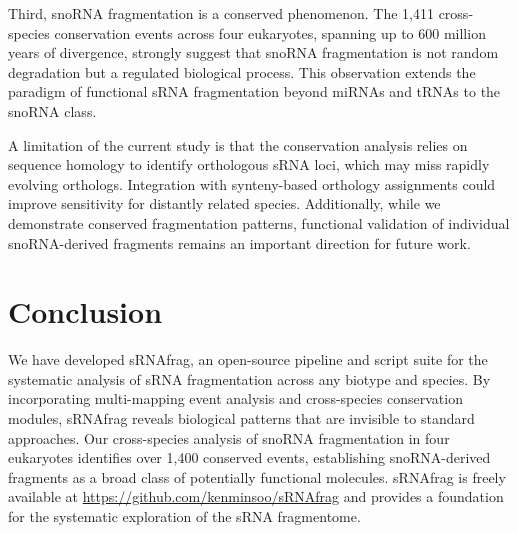 \documentclass[11pt]{article}
\begin{document}
Third, snoRNA fragmentation is a conserved phenomenon. The 1,411 cross-species conservation events across four eukaryotes, spanning up to 600 million years of divergence, strongly suggest that snoRNA fragmentation is not random degradation but a regulated biological process. This observation extends the paradigm of functional sRNA fragmentation beyond miRNAs and tRNAs to the snoRNA class.

A limitation of the current study is that the conservation analysis relies on sequence homology to identify orthologous sRNA loci, which may miss rapidly evolving orthologs. Integration with synteny-based orthology assignments could improve sensitivity for distantly related species. Additionally, while we demonstrate conserved fragmentation patterns, functional validation of individual snoRNA-derived fragments remains an important direction for future work.

\section{Conclusion}

We have developed sRNAfrag, an open-source pipeline and script suite for the systematic analysis of sRNA fragmentation across any biotype and species. By incorporating multi-mapping event analysis and cross-species conservation modules, sRNAfrag reveals biological patterns that are invisible to standard approaches. Our cross-species analysis of snoRNA fragmentation in four eukaryotes identifies over 1,400 conserved events, establishing snoRNA-derived fragments as a broad class of potentially functional molecules. sRNAfrag is freely available at \url{https://github.com/kenminsoo/sRNAfrag} and provides a foundation for the systematic exploration of the sRNA fragmentome.



\end{document}
